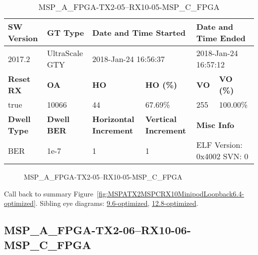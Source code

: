 \begin{table}[h]
\centering
\caption{MSP\_A\_FPGA-TX2-05--RX10-05-MSP\_C\_FPGA}
\label{tab:MSPAFPGATX205RX1005MSPCFPGA6.4-optimized}
\begin{tabular}{@{}|l|l|l|l|l|l|@{}}
\toprule
\textbf{SW Version}                & \textbf{GT Type}   & \multicolumn{2}{l|}{\textbf{Date and Time Started}}            & \multicolumn{2}{l|}{\textbf{Date and Time Ended}}        \\ \midrule
2017.2                       & UltraScale GTY          & \multicolumn{2}{l|}{2018-Jan-24 16:56:37}                   & \multicolumn{2}{l|}{2018-Jan-24 16:57:12}               \\ \midrule
\textbf{Reset RX}                  & \textbf{OA} & \textbf{HO}   & \textbf{HO (\%)} & \textbf{VO} & \textbf{VO (\%)} \\ \midrule
true & 10066        & 44          & 67.69\%        & 255        & 100.00\%       \\ \midrule
\textbf{Dwell Type}                & \textbf{Dwell BER} & \textbf{Horizontal Increment} & \textbf{Vertical Increment}    & \multicolumn{2}{l|}{\textbf{Misc Info}}                  \\ \midrule
BER                            & 1e-7        & 1        & 1           & \multicolumn{2}{l|}{ELF Version: 0x4002 SVN: 0}                         \\ \bottomrule
\end{tabular}
\end{table}

\begin{figure}[h]
\caption{MSP\_A\_FPGA-TX2-05--RX10-05-MSP\_C\_FPGA} \label{fig:MSPAFPGATX205RX1005MSPCFPGA6.4-optimized}
\end{figure}

Call back to summary Figure~\ref{fig:MSPATX2MSPCRX10MinipodLoopback6.4-optimized}.
Sibling eye diagrams: \hyperref[sec:MSPAFPGATX205RX1005MSPCFPGA9.6-optimized]{9.6-optimized}, \hyperref[sec:MSPAFPGATX205RX1005MSPCFPGA12.8-optimized]{12.8-optimized}.

\clearpage
\newpage


\subsection{MSP\_A\_FPGA-TX2-06--RX10-06-MSP\_C\_FPGA}\label{sec:MSPAFPGATX206RX1006MSPCFPGA6.4-optimized}

